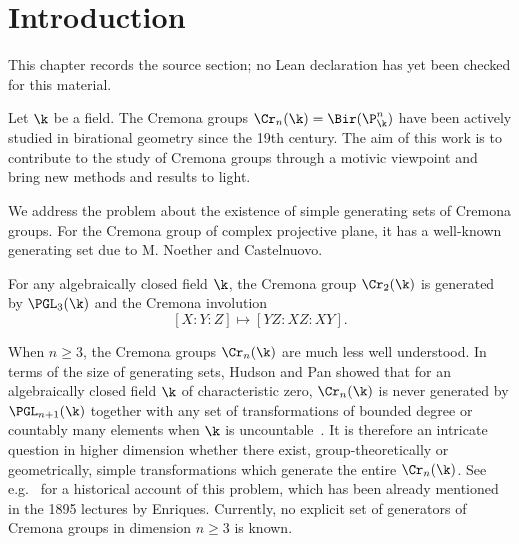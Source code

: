 \chapter{Introduction}
\label{motivic-invariants-birational-maps-chapter-01}

\begin{remark}
\label{motivic-invariants-birational-maps-chapter-01-source}
This chapter records the source section; no Lean declaration has yet been checked for this material.
\notready
\end{remark}

Let $\k$ be a field.
The Cremona groups $\Cr_n(\k) = \Bir(\P^n_{\k})$
have been actively studied in birational geometry since
the 19th century.
The aim of this work is to contribute to the study of Cremona groups
through a motivic viewpoint
and bring new methods and results to light.




We address the problem
about the existence of simple generating sets of Cremona groups.
For the Cremona group of complex projective plane,
it has a well-known generating set due to
M. Noether and Castelnuovo.


\begin{theorem}
\notready\label{thm:noether}
For any algebraically closed field $\k$,
the Cremona group $\Cr_2(\k)$ is generated by $\PGL_3(\k)$
and the Cremona involution
\[[X:Y:Z] \mapsto [YZ:XZ:XY].\]
\end{theorem}

When $n \ge 3$, the Cremona groups $\Cr_n(\k)$
are much less well understood.
In terms of the size of generating sets, Hudson and Pan showed that
for an algebraically closed field $\k$ of characteristic zero,
$\Cr_n(\k)$ is never generated by $\PGL_{n+1}(\k)$
together with any set of transformations of bounded degree
or countably many elements
when $\k$ is uncountable~\cite{HudsonPan}.
It is therefore an intricate
question in higher dimension whether there exist,
group-theoretically or geometrically,
simple transformations
which generate the entire $\Cr_n(\k)$.
See e.g.~\cite[1.C]{BLZ} for a historical account of this problem,
which has been already mentioned in the 1895
lectures by Enriques.
Currently, no explicit set of generators
of Cremona groups in dimension $n \ge 3$ is known.





